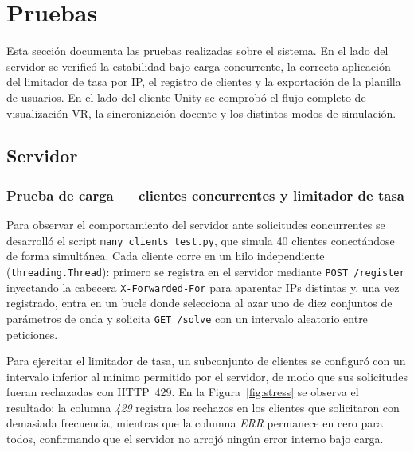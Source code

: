 \documentclass[12pt, a4paper]{article}
\begin{document}
\newpage



\newpage



\newpage

\section{Pruebas}

Esta sección documenta las pruebas realizadas sobre el sistema. En el lado del
servidor se verificó la estabilidad bajo carga concurrente, la correcta
aplicación del limitador de tasa por IP, el registro de clientes y la
exportación de la planilla de usuarios. En el lado del cliente Unity se
comprobó el flujo completo de visualización VR, la sincronización docente y
los distintos modos de simulación.

\subsection{Servidor}

\subsubsection*{Prueba de carga — clientes concurrentes y limitador de tasa}

Para observar el comportamiento del servidor ante solicitudes concurrentes se desarrolló el
script \texttt{many\_clients\_test.py}, que simula 40 clientes conectándose de
forma simultánea. Cada cliente corre en un hilo independiente
(\texttt{threading.Thread}): primero se registra en el servidor mediante
\texttt{POST /register} inyectando la cabecera \texttt{X-Forwarded-For} para
aparentar IPs distintas y, una vez registrado, entra en un bucle donde
selecciona al azar uno de diez conjuntos de parámetros de onda y solicita
\texttt{GET /solve} con un intervalo aleatorio entre peticiones.

Para ejercitar el limitador de tasa, un subconjunto de clientes se configuró
con un intervalo inferior al mínimo permitido por el servidor, de modo que sus
solicitudes fueran rechazadas con HTTP~429. En la Figura~\ref{fig:stress} se
observa el resultado: la columna \textit{429} registra los rechazos en los
clientes que solicitaron con demasiada frecuencia, mientras que la columna
\textit{ERR} permanece en cero para todos, confirmando que el servidor no
arrojó ningún error interno bajo carga.
\end{document}
